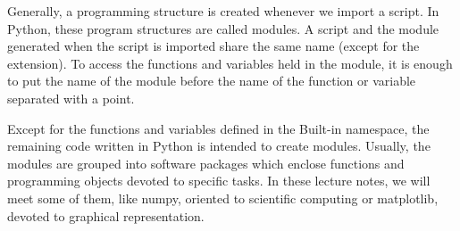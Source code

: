 \begin{paracol}{2}
Generally, a programming structure is created whenever we import a script. In Python, these program structures are called modules. A  script and the module generated when the script is imported share the same name (except for the extension). To access the functions and 
variables held in the module, it is enough to put the name of the module before the name of the function or variable separated with a point.

Except for the functions and variables defined in the Built-in namespace, the remaining code written in Python is intended to create modules. Usually, the modules are grouped into software packages which enclose functions and programming objects devoted to specific tasks. In these lecture notes, we will meet some of them, like numpy, oriented to scientific computing or matplotlib, devoted to graphical representation.    
\end{paracol}

